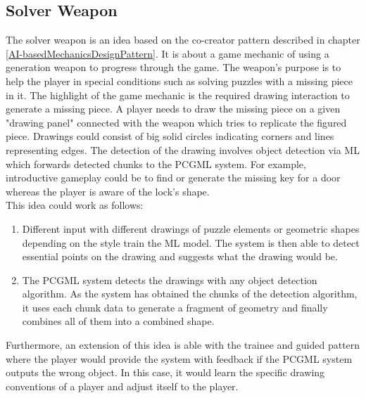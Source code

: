 \documentclass[MGS,Master,english]{twbook}%
\begin{document}
\subsection{Solver Weapon} \label{idea::solverWeapon}
The solver weapon is an idea based on the co-creator pattern described in chapter \ref{AI-basedMechanicsDesignPattern}. It is about a game mechanic of using a generation weapon to progress through the game. The weapon's purpose is to help the player in special conditions such as solving puzzles with a missing piece in it. The highlight of the game mechanic is the required drawing interaction to generate a missing piece. A player needs to draw the missing piece on a given "drawing panel" connected with the weapon which tries to replicate the figured piece. Drawings could consist of big solid circles indicating corners and lines representing edges. The detection of the drawing involves object detection via ML which forwards detected chunks to the PCGML system. For example, introductive gameplay could be to find or generate the missing key for a door whereas the player is aware of the lock's shape.\\
This idea could work as follows: 
\begin{enumerate}
	\item Different input with different drawings of puzzle elements or geometric shapes depending on the style train the ML model. The system is then able to detect essential points on the drawing and suggests what the drawing would be.
	\item The PCGML system detects the drawings with any object detection algorithm. As the system has obtained the chunks of the detection algorithm, it uses each chunk data to generate a fragment of geometry and finally combines all of them into a combined shape.
\end{enumerate}
Furthermore, an extension of this idea is able with the trainee and guided pattern where the player would provide the system with feedback if the PCGML system outputs the wrong object. In this case, it would learn the specific drawing conventions of a player and adjust itself to the player.
\end{document}
